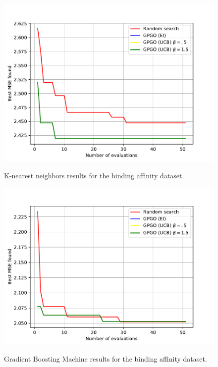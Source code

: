 \documentclass[10pt,a4paper,twoside]{book}
\begin{document}
\begin{figure}
\centering
\caption{K-nearest neighbors results for the binding affinity dataset.}
\includegraphics[scale=0.75]{figures/chapter4/aff/knn}
\label{fig:affknn}
\end{figure}

\begin{figure}
\centering
\caption{Gradient Boosting Machine results for the binding affinity dataset.}
\includegraphics[scale=0.75]{figures/chapter4/aff/gbm}
\label{fig:affgbm}
\end{figure}
\end{document}
